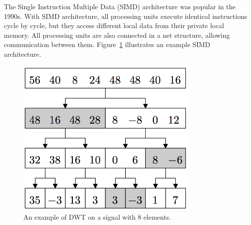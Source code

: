 The Single Instruction Multiple Data (SIMD) architecture was popular in the
1990s.
%
With SIMD architecture, all processing units execute identical instructions
cycle by cycle, but they access different local data from their private 
local memory.
%
All processing units are also connected in a net structure, allowing
communication between them.
%
Figure~\ref{fig:simd1} illustrates an example SIMD architecture.

\begin{figure}[p]
    \centering
    \includegraphics[width=0.8\textwidth]{fig/example1.png}
    \caption{An example of DWT on a signal with 8 elements.}
    \label{fig:simd1}
\end{figure}


\cite{lee1994parallel}

